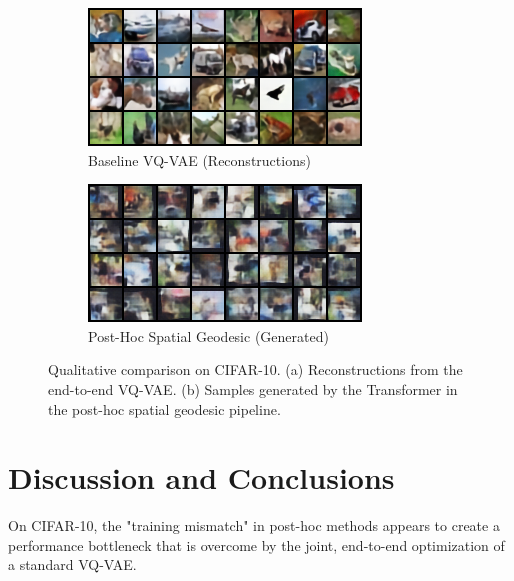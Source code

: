 \documentclass{article}
\begin{document}
\begin{figure}[ht!]
    \centering
    \begin{subfigure}[b]{0.49\columnwidth}
        \includegraphics[width=\linewidth]{images/cifar10_baselineVQ.png}
        \caption{Baseline VQ-VAE (Reconstructions)}
        \label{fig:cifar_baseline}
    \end{subfigure}
    \hfill
    \begin{subfigure}[b]{0.49\columnwidth}
        \includegraphics[width=\linewidth]{images/cifar10_spatial_geodesic_generated_samples.png}
        \caption{Post-Hoc Spatial Geodesic (Generated)}
        \label{fig:cifar_spatial}
    \end{subfigure}
    \caption{Qualitative comparison on CIFAR-10. (a) Reconstructions from the end-to-end VQ-VAE. (b) Samples generated by the Transformer in the post-hoc spatial geodesic pipeline.}
    \label{fig:cifar_recon}
\end{figure}

\section{Discussion and Conclusions}
On CIFAR-10, the "training mismatch" in post-hoc methods appears to create a performance bottleneck that is overcome by the joint, end-to-end optimization of a standard VQ-VAE.
\end{document}
